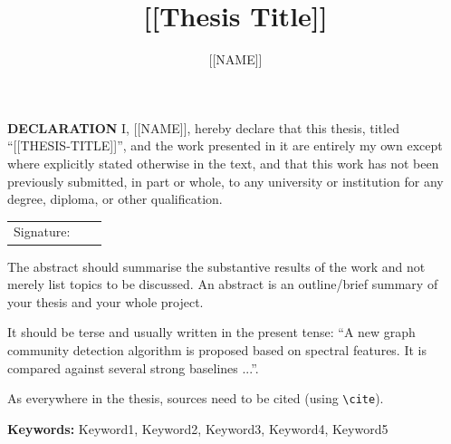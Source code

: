\documentclass[a4paper,12pt]{Classes/RoboticsLaTeX}
\title{\Large{[[Thesis Title]]}}
\author{[[NAME]]}
\begin{document}
	\begin{spacing}{1}
		\maketitle
	\end{spacing}
	
	\newpage\null\thispagestyle{empty}\newpage
	
	\setcounter{secnumdepth}{3}
	\setcounter{tocdepth}{3}
	
	\frontmatter
	
	\textbf{DECLARATION} 
	I, [[NAME]], hereby declare that this thesis, titled ``[[THESIS-TITLE]]'', and the work presented in it are entirely my own except where explicitly stated otherwise in the text, and that this work has not been previously submitted, in part or whole, to any university or institution for any degree, diploma, or other qualification. 
	\newline
	
	\begin{tabular}{@{}p{.5in}p{4in}@{}}
		Signature: & ~~\hrulefill \\
	\end{tabular}
	\newpage
	
	
	
	
	\begin{abstracts}
		The abstract should summarise the substantive results of the work and not merely list topics to be discussed. An abstract is an outline/brief summary of your thesis and your whole project. 
		
		It should be terse and usually written in the present tense: ``A new graph community detection algorithm is proposed based on spectral features. It is compared against several strong baselines ...''.
		
		As everywhere in the thesis, sources need to be cited (using \texttt{\textbackslash cite}).
		
		\textbf{Keywords: } Keyword1, Keyword2, Keyword3, Keyword4, Keyword5
	\end{abstracts}
	
	
	\tableofcontents
	\listoffigures
	\listoftables
	\printglossary[title=List of Acronyms,type=\acronymtype]
		
\end{document}
